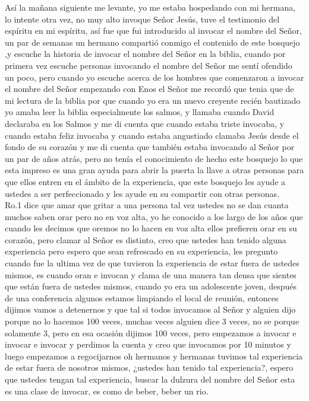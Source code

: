 \documentclass[12pt]{article}
\begin{document}
Así la mañana siguiente me levante, yo me estaba hospedando con mi hermana, lo intente otra vez, no muy alto invoque Señor Jesús, tuve el testimonio del espíritu en mi espíritu, así fue que fui introducido al invocar el nombre del Señor, un par de semanas un hermano compartió conmigo el contenido de este bosquejo ,y escuche la historia de invocar el nombre del Señor en la biblia, cuando por primera vez escuche personas invocando el nombre del Señor me sentí ofendido un poco, pero cuando yo escuche acerca de los hombres que comenzaron a invocar el nombre del Señor empezando con Enos el Señor me recordó que tenia que de mi lectura de la biblia por que cuando yo era un nuevo creyente recién bautizado yo amaba leer la biblia especialmente los salmos, y llamaba cuando David declaraba en los Salmos y me di cuenta que cuando estaba triste invocaba, y cuando estaba feliz invocaba y cuando estaba angustiado clamaba Jesús desde el fondo de su corazón y me di cuenta que también estaba invocando al Señor por un par de años atrás, pero no tenía el conocimiento de hecho este bosquejo lo que esta impreso es una gran ayuda para abrir la puerta la llave a otras personas para que ellos entren en el ámbito de la experiencia, que este bosquejo les ayude a ustedes a ser perfeccionado y les ayude en su compartir con otras personas.\\

Ro.1 dice que amar que gritar  a una persona tal vez ustedes no  se dan cuanta muchos saben orar pero no en voz  alta, yo he conocido a los largo de los años que cuando les decimos que oremos no lo hacen en voz alta ellos prefieren orar en su corazón, pero clamar al Señor es distinto, creo que ustedes han tenido alguna experiencia pero espero que sean refrescado en su experiencia, les pregunto cuando fue la ultima vez de que tuvieron la experiencia de estar fuera de ustedes mismos, es cuando oran e invocan y clama de una manera tan densa que sientes que están fuera de ustedes mismos, cuando yo era un adolescente joven, después de una conferencia algunos estamos limpiando el local de reunión, entonces dijimos vamos a detenernos y que tal si todos invocamos al Señor y alguien dijo porque no lo hacemos 100 veces, muchas veces alguien dice 3 veces, no se porque solamente 3, pero en esa ocasión dijimos 100 veces, pero empezamos a invocar e invocar e invocar y perdimos la cuenta y creo que invocamos por 10 minutos y luego empezamos a regocijarnos oh hermanos y hermanas  tuvimos tal experiencia de estar fuera de nosotros mismos, ¿ustedes han tenido tal experiencia?, espero que ustedes tengan tal experiencia, buscar la dulzura del nombre del Señor esta es una clase de invocar, es como de beber, beber un rio.\\
\end{document}
